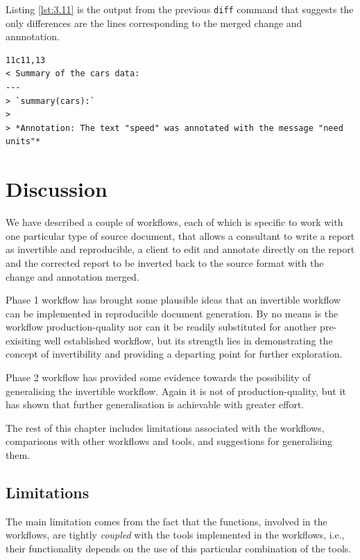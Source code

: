 \documentclass[a4paper, 12pt]{report}
\begin{document}
Listing \ref{lst:3.11} is the output from the previous \texttt{diff} command that suggests the only differences are the lines corresponding to the merged change and annnotation.
\begin{lstlisting}[caption={Output from \texttt{diff}}, label={lst:3.11}]
11c11,13
< Summary of the cars data:
---
> `summary(cars):`
> 
> *Annotation: The text "speed" was annotated with the message "need units"*
\end{lstlisting}



\chapter{Discussion}
We have described a couple of workflows, each of which is specific to work with one  particular type of source document, that allows a consultant to write a report as invertible and reproducible, a client to edit and annotate directly on the report and the corrected report to be inverted back to the source format with the change and annotation merged.

Phase 1 workflow has brought some plausible ideas that an invertible workflow can be implemented in reproducible document generation. By no means is the workflow production-quality nor can it be readily substituted for another pre-exisiting well established workflow, but its strength lies in demonstrating the concept of invertibility and providing a departing point for further exploration.

Phase 2 workflow has provided some evidence towards the possibility of generalising the invertible workflow. Again it is not of production-quality, but it has shown that further generalisation is achievable with greater effort.

The rest of this chapter includes limitations associated with the workflows, comparisons with other workflows and tools, and suggestions for generalising them.

\section*{Limitations}
The main limitation comes from the fact that the functions, involved in the workflows, are tightly \emph{coupled} with the tools implemented in the workflows, i.e., their functionality depends on the use of this particular combination of the tools.
\end{document}
